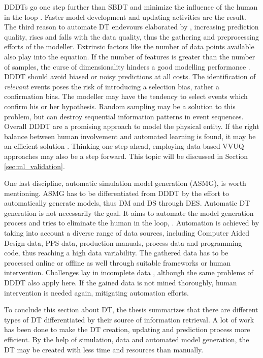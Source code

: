 DDDTs go one step further than SBDT and minimize the influence of the human in the loop \autocite{francis2021towards,Friederich2022}. Faster model development and updating activities are the result. The third reason to automate DT endevours elaborated by \citeauthor{schwede2024learning}, increasing prediction quality, rises and falls with the data quality, thus the gathering and preprocessing efforts of the modeller. Extrinsic factors like the number of data points available also play into the equation. If the number of features is greater than the number of samples, the curse of dimensionality hinders a good modelling performance \autocite{koppen2000curse}. DDDT should avoid biased or noisy predictions at all costs. The identification of \textit{relevant} events poses the risk of introducing a selection bias, rather a confirmation bias. The modeller may have the tendency to select events which confirm his or her hypothesis. Random sampling may be a solution to this problem, but can destroy sequential information patterns in event sequences. Overall DDDT are a promising approach to model the physical entity. If the right balance between human involvement and automated learning is found, it may be an efficient solution \autocite{francis2021towards}. Thinking one step ahead, employing data-based VVUQ approaches may also be a step forward. This topic will be discussed in Section \autoref{sec:ml_validation}.

\label{par:asmg}
One last discipline, automatic simulation model generation (ASMG), is worth mentioning. ASMG has to be differentiated from DDDT by the effort to automatically generate models, thus DM and DS through DES. Automatic DT generation is not necessarily the goal. It aims to automate the model generation process and tries to eliminate the human in the loop, \autocite{reinhardt2019survey,lechevalier2018methodology}. Automation is achieved by taking into account a diverse range of data sources, including Computer Aided Design data, PPS data, production manuals, process data and programming code, thus reaching a high data variability. The gathered data has to be processed online or offline as well through suitable frameworks or human intervention. Challenges lay in incomplete data \autocite{bergmann2014automatische}, although the same problems of DDDT also apply here. If the gained data is not mined thoroughly, human intervention is needed again, mitigating automation efforts.

To conclude this section about DT, the thesis summarizes that there are different types of DT differentiated by their source of information retrieval. A lot of work has been done to make the DT creation, updating and prediction process more efficient. By the help of simulation, data and automated model generation, the DT may be created with less time and resources than manually.

